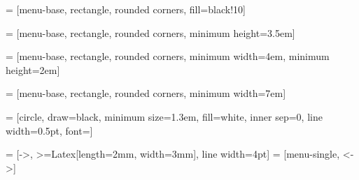 = [menu-base, rectangle, rounded corners, fill=black!10]

 = [menu-base, rectangle, rounded corners, minimum height=3.5em]

 = [menu-base, rectangle, rounded corners, minimum
width=4em, minimum height=2em]

 = [menu-base, rectangle, rounded corners, minimum
width=7em]

 = [circle, draw=black, minimum size=1.3em, fill=white, inner
sep=0, line width=0.5pt, font=\footnotesize]

 = [->, >={Latex[length=2mm, width=3mm]}, line width=4pt]
 = [menu-single, <->]

\newcommand{\LRvert}[2]{%
    \draw[menu-single] ([xshift=1em]#1.south) -- node[button-label] {R}
        ([xshift=1em]#2.north);
    \draw[menu-single] ([xshift=-1em]#2.north) -- node[button-label] {L}
        ([xshift=-1em]#1.south);
}

\newcommand{\LRhor}[2]{%
    \draw[menu-single] ([yshift=0.5em]#1.east) -- node[button-label] {R}
        ([yshift=0.5em]#2.west);
    \draw[menu-single] ([yshift=-0.5em]#2.west) -- node[button-label] {L}
        ([yshift=-0.5em]#1.east);
}

\newcommand{\IncrementDecrementNode}[2]{%
    \node (_#2anchor) [#1=\shortarrowlength+1.3em of #2, outer sep=1pt, inner sep=0] {};
    \node (_#2L) [button-label, above left=0.2em of _#2anchor] {L};
    \node (_#2dec) [below left=0.2em of _#2anchor, inner sep=0, circle, minimum size=1.3em] {--};
    \node (_#2R) [button-label, above right=0.2em of _#2anchor] {R};
    \node (_#2inc) [below right=0.2em of _#2anchor, inner sep=0, circle, minimum size=1.3em] {+};
    \node (_#2set) [fit={(_#2L) (_#2R) (_#2dec) (_#2inc)}, draw] {};
}

\newcommand{\SetTimeNode}[3]{%
    \node (#1) [#2, menu-small-item] {#3};
    \IncrementDecrementNode{below}{#1}
    \draw[menu-double] (#1) -- node[button-label] {SP} (_#1set.north);
}

\newcommand{\DoubleArrowWE}[4]{%
    \draw[arrow] ([yshift=.5em]#1.east) -- node[midway, above]{#3} ([yshift=0.5em]#2.west);
    \draw[arrow] ([yshift=-.5em]#2.west) -- node[midway, below]{#4} ([yshift=-0.5em]#1.east);
}
\newcommand{\DoubleArrowNS}[4]{%
    \draw[arrow] ([xshift=.5em]#1.south) -- node[midway, right]{#3} ([xshift=0.5em]#2.north);
    \draw[arrow] ([xshift=-.5em]#2.north) -- node[midway, left]{#4} ([xshift=-0.5em]#1.south);
}

